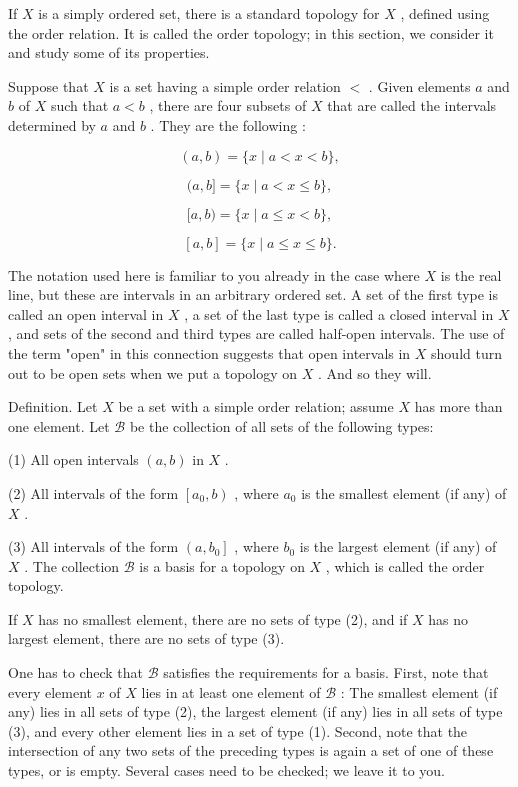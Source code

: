 \documentclass[10pt]{article}
\begin{document}
If \(X\) is a simply ordered set, there is a standard topology for \(X\) , defined using the order relation. It is called the order topology; in this section, we consider it and study some of its properties.

Suppose that \(X\) is a set having a simple order relation \(<\) . Given elements \(a\) and \(b\) of \(X\) such that \(a < b\) , there are four subsets of \(X\) that are called the intervals determined by \(a\) and \(b\) . They are the following :

\[
\left( {a,b}\right)  = \{ x \mid  a < x < b\} ,
\]

\[
(a,b\rbrack  = \{ x \mid  a < x \leq  b\} ,
\]

\[
\lbrack a,b) = \{ x \mid  a \leq  x < b\} ,
\]

\[
\left\lbrack  {a,b}\right\rbrack   = \{ x \mid  a \leq  x \leq  b\} .
\]

The notation used here is familiar to you already in the case where \(X\) is the real line, but these are intervals in an arbitrary ordered set. A set of the first type is called an open interval in \(X\) , a set of the last type is called a closed interval in \(X\) , and sets of the second and third types are called half-open intervals. The use of the term "open" in this connection suggests that open intervals in \(X\) should turn out to be open sets when we put a topology on \(X\) . And so they will.

Definition. Let \(X\) be a set with a simple order relation; assume \(X\) has more than one element. Let \(\mathcal{B}\) be the collection of all sets of the following types:

(1) All open intervals \(\left( {a,b}\right)\) in \(X\) .

(2) All intervals of the form \(\left\lbrack  {{a}_{0},b}\right)\) , where \({a}_{0}\) is the smallest element (if any) of \(X\) .

(3) All intervals of the form \(\left( {a,{b}_{0}}\right\rbrack\) , where \({b}_{0}\) is the largest element (if any) of \(X\) . The collection \(\mathcal{B}\) is a basis for a topology on \(X\) , which is called the order topology.

If \(X\) has no smallest element, there are no sets of type (2), and if \(X\) has no largest element, there are no sets of type (3).

One has to check that \(\mathcal{B}\) satisfies the requirements for a basis. First, note that every element \(x\) of \(X\) lies in at least one element of \(\mathcal{B}\) : The smallest element (if any) lies in all sets of type (2), the largest element (if any) lies in all sets of type (3), and every other element lies in a set of type (1). Second, note that the intersection of any two sets of the preceding types is again a set of one of these types, or is empty. Several cases need to be checked; we leave it to you.
\end{document}
